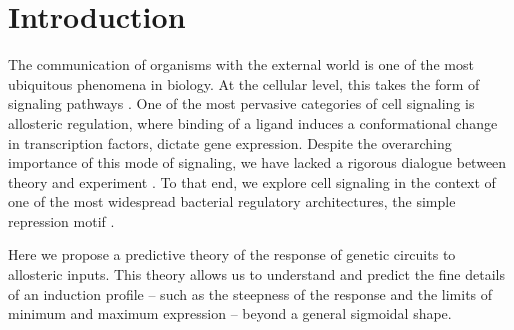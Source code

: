 \section*{Introduction}


The communication of organisms with the external world is one of the most
ubiquitous phenomena in biology. At the cellular level, this takes the form of
signaling pathways .
One of the most pervasive categories of cell signaling is allosteric
regulation, where binding of a ligand induces a conformational change in
transcription factors, dictate gene expression. Despite the overarching
importance of this mode of signaling, we have lacked a rigorous dialogue
between theory and experiment \cite{Lindsley2006}. To that end, we
explore cell signaling in the context of one of the most widespread bacterial
regulatory architectures, the simple repression motif \cite{Rydenfelt2014}.


Here we propose a predictive theory of the response of genetic circuits to
allosteric inputs. This theory allows us to understand and predict the fine
details of an induction profile -- such as the steepness of the response and
the limits of minimum and maximum expression -- beyond a general sigmoidal
shape.


%
%


